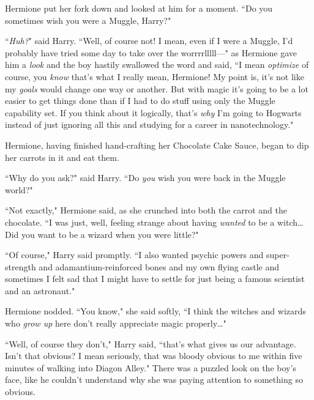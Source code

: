 Hermione put her fork down and looked at him for a moment. ``Do you sometimes wish you were a Muggle, Harry?"

``\emph{Huh?}" said Harry. ``Well, of course not! I mean, even if I were a Muggle, I'd probably have tried some day to take over the worrrrlllll—" as Hermione gave him a \emph{look} and the boy hastily swallowed the word and said, ``I mean \emph{optimize} of course, you \emph{know} that's what I really mean, Hermione! My point is, it's not like my \emph{goals} would change one way or another. But with magic it's going to be a lot easier to get things done than if I had to do stuff using only the Muggle capability set. If you think about it logically, that's \emph{why} I'm going to Hogwarts instead of just ignoring all this and studying for a career in nanotechnology."

Hermione, having finished hand-crafting her Chocolate Cake Sauce, began to dip her carrots in it and eat them.

``Why do you ask?" said Harry. ``Do \emph{you} wish you were back in the Muggle world?"

``Not exactly," Hermione said, as she crunched into both the carrot and the chocolate. ``I was just, well, feeling strange about having \emph{wanted} to be a witch{\ldots} Did you want to be a wizard when you were little?"

``Of course," Harry said promptly. ``I also wanted psychic powers and super-strength and adamantium-reinforced bones and my own flying castle and sometimes I felt sad that I might have to settle for just being a famous scientist and an astronaut."

Hermione nodded. ``You know," she said softly, ``I think the witches and wizards who \emph{grow up} here don't really appreciate magic properly{\ldots}"

``Well, of course they don't," Harry said, ``that's what gives us our advantage. Isn't that obvious? I mean seriously, that was bloody obvious to me within five minutes of walking into Diagon Alley." There was a puzzled look on the boy's face, like he couldn't understand why she was paying attention to something so obvious.

